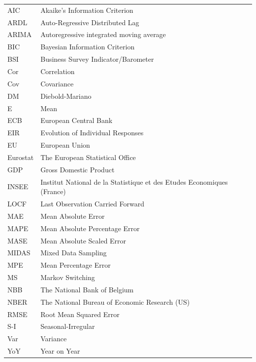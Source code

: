 \documentclass[12pt,a4paper,oneside]{book}
\begin{document}
\begin{tabular}{l l}
  AIC       & Akaike's Information Criterion \\
  ARDL      & Auto-Regressive Distributed Lag \\
  ARIMA     & Autoregressive integrated moving average \\
  BIC		& Bayesian Information Criterion \\
  BSI       & Business Survey Indicator/Barometer \\
  Cor       & Correlation \\
  Cov       & Covariance \\
  DM        & Diebold-Mariano \\
  E         & Mean \\
  ECB       & European Central Bank \\
  EIR       & Evolution of Individual Responses \\
  EU		& European Union \\
  Eurostat  & The European Statistical Office \\
  GDP       & Gross Domestic Product \\
  INSEE     & Institut National de la Statistique et des Etudes Economiques (France) \\
  LOCF 		& Last Observation Carried Forward \\
  MAE 		& Mean Absolute Error \\
  MAPE		& Mean Absolute Percentage Error \\
  MASE 		& Mean Absolute Scaled Error \\
  MIDAS     & Mixed Data Sampling \\
  MPE 		& Mean Percentage Error \\
  MS        & Markov Switching \\
  NBB       & The National Bank of Belgium \\
  NBER      & The National Bureau of Economic Research (US) \\ 
  RMSE 		& Root Mean Squared Error \\
  S-I       & Seasonal-Irregular \\
  Var       & Variance \\
  YoY       & Year on Year 
\end{tabular}

\tableofcontents

\newpage
\setcounter{page}{0}
\end{document}
